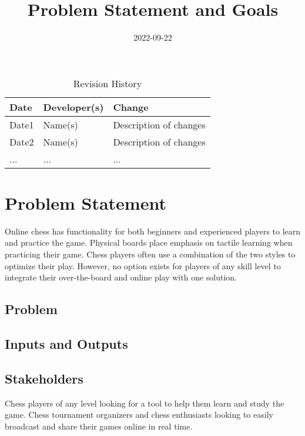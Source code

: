 \documentclass{article}
\title{Problem Statement and Goals\\\progname}
\author{\authname}
\date{2022-09-22}
\begin{document}
\maketitle

\begin{table}[hp]
\caption{Revision History} \label{TblRevisionHistory}
\begin{tabularx}{\textwidth}{llX}
\toprule
\textbf{Date} & \textbf{Developer(s)} & \textbf{Change}\\
\midrule
Date1 & Name(s) & Description of changes\\
Date2 & Name(s) & Description of changes\\
... & ... & ...\\
\bottomrule
\end{tabularx}
\end{table}

\section{Problem Statement}

{Online chess has functionality for both beginners and experienced players to learn and practice the game. Physical boards place emphasis on tactile learning when practicing their game. Chess players often use a combination of the two styles to optimize their play. However, no option exists for players of any skill level to integrate their over-the-board and online play with one solution.}

\subsection{Problem}

\subsection{Inputs and Outputs}


\subsection{Stakeholders}
Chess players of any level looking for a tool to help them learn and study the game. Chess tournament organizers and chess enthusiasts looking to easily broadcast and share their games online in real time. 
\end{document}
